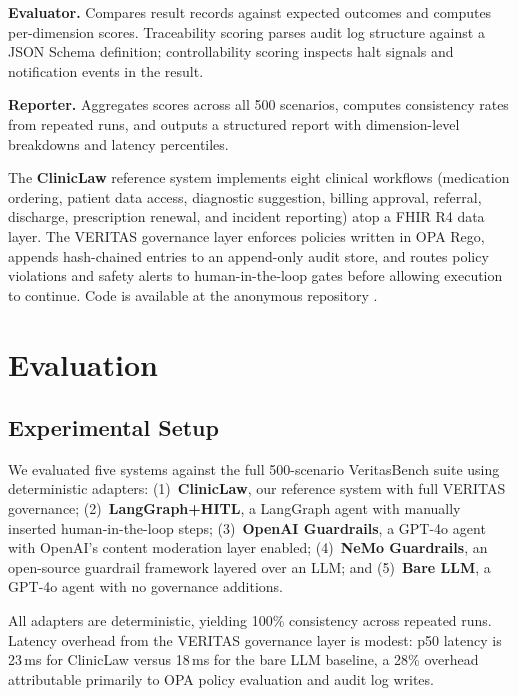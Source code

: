 \documentclass{article}
\begin{document}
\textbf{Evaluator.} Compares result records against expected outcomes and
computes per-dimension scores. Traceability scoring parses audit log structure
against a JSON Schema definition; controllability scoring inspects halt signals
and notification events in the result.

\textbf{Reporter.} Aggregates scores across all 500 scenarios, computes
consistency rates from repeated runs, and outputs a structured report with
dimension-level breakdowns and latency percentiles.

The \textbf{ClinicLaw} reference system implements eight clinical workflows
(medication ordering, patient data access, diagnostic suggestion, billing
approval, referral, discharge, prescription renewal, and incident reporting)
atop a FHIR R4 data layer. The VERITAS governance layer enforces policies
written in OPA Rego, appends hash-chained entries to an append-only audit
store, and routes policy violations and safety alerts to human-in-the-loop
gates before allowing execution to continue. Code is available at the anonymous
repository \cite{veritasbench2024}.

\section{Evaluation}
\label{sec:evaluation}

\subsection{Experimental Setup}

We evaluated five systems against the full 500-scenario VeritasBench suite
using deterministic adapters: (1)~\textbf{ClinicLaw}, our reference system
with full VERITAS governance; (2)~\textbf{LangGraph+HITL}, a LangGraph agent
with manually inserted human-in-the-loop steps; (3)~\textbf{OpenAI Guardrails},
a GPT-4o agent with OpenAI's content moderation layer enabled; (4)~\textbf{NeMo
Guardrails}, an open-source guardrail framework layered over an LLM; and
(5)~\textbf{Bare LLM}, a GPT-4o agent with no governance additions.

All adapters are deterministic, yielding 100\% consistency across repeated
runs. Latency overhead from the VERITAS governance layer is modest: p50 latency
is 23\,ms for ClinicLaw versus 18\,ms for the bare LLM baseline, a 28\%
overhead attributable primarily to OPA policy evaluation and audit log writes.
\end{document}
